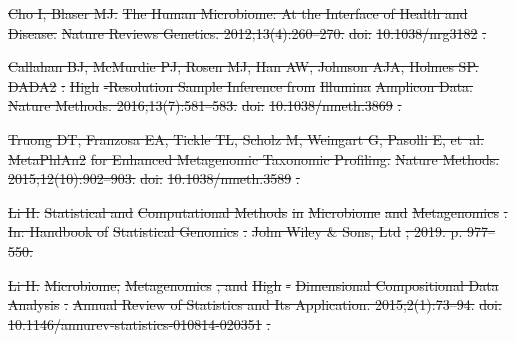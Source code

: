 \documentclass[10pt,letterpaper]{article}
\providecommand{\DIFdeltex}[1]{{\protect\color{red}\sout{#1}}}                      %
\providecommand{\DIFdel}[1]{\texorpdfstring{\DIFdeltex{#1}}{}} %
\begin{document}
\DIFdel{Cho I, Blaser MJ.
}%
\DIFdel{The Human Microbiome: At the Interface of Health and Disease.
}%
\DIFdel{Nature Reviews Genetics. 2012;13(4):260--270.
}%
\DIFdel{doi:}%
\DIFdel{10.1038/nrg3182}%
\DIFdel{.
}%

\DIFdel{Callahan BJ, McMurdie PJ, Rosen MJ, Han AW, Johnson AJA, Holmes SP.
}%
\DIFdel{DADA2}%
\DIFdel{: }%
\DIFdel{High}%
\DIFdel{-Resolution Sample Inference from }%
\DIFdel{Illumina}%
\DIFdel{Amplicon Data.
}%
\DIFdel{Nature Methods. 2016;13(7):581--583.
}%
\DIFdel{doi:}%
\DIFdel{10.1038/nmeth.3869}%
\DIFdel{.
}%

\DIFdel{Truong DT, Franzosa EA, Tickle TL, Scholz M, Weingart G, Pasolli E, et~al.
}%
\DIFdel{MetaPhlAn2}%
\DIFdel{for Enhanced Metagenomic Taxonomic Profiling.
}%
\DIFdel{Nature Methods. 2015;12(10):902--903.
}%
\DIFdel{doi:}%
\DIFdel{10.1038/nmeth.3589}%
\DIFdel{.
}%

\DIFdel{Li H.
}%
\DIFdel{Statistical and }%
\DIFdel{Computational Methods}%
\DIFdel{in }%
\DIFdel{Microbiome}%
\DIFdel{and
  }%
\DIFdel{Metagenomics}%
\DIFdel{.
}%
\DIFdel{In: Handbook of }%
\DIFdel{Statistical Genomics}%
\DIFdel{. }%
\DIFdel{John Wiley \& Sons, Ltd}%
\DIFdel{;
  2019. p. 977--550.
}%

\DIFdel{Li H.
}%
\DIFdel{Microbiome, }%
\DIFdel{Metagenomics}%
\DIFdel{, and }%
\DIFdel{High}%
\DIFdel{-}%
\DIFdel{Dimensional
  Compositional Data Analysis}%
\DIFdel{.
}%
\DIFdel{Annual Review of Statistics and Its Application. 2015;2(1):73--94.
}%
\DIFdel{doi:}%
\DIFdel{10.1146/annurev-statistics-010814-020351}%
\DIFdel{.
}%
\end{document}

